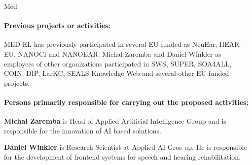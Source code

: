 \begin{sitedescription}{Med}
\paragraph*{Previous projects or activities:}

\begin{compactitem}
\item MED-EL has previously participated in several EU-funded as NeuEar, HEAR-EU, NANOCI and NANOEAR. Michal Zaremba and Daniel Winkler as employees of other organizations participated in SWS, SUPER, SOA4ALL, COIN, DIP, LarKC, SEALS Knowledge Web and several other EU-funded projects.
\end{compactitem}


\paragraph*{Persons primarily responsible for carrying out the proposed activities:}

\begin{compactitem} %

\item{\bf Michal Zaremba} is Head of Applied Artificial Intelligence Group and is responsible for the innovation of AI based solutions.

\item{\bf Daniel Winkler} is Research Scientist at Applied AI Gros
  up. He is responsible for the development of frontend systems for speech and hearing rehabilitation.
    
\end{compactitem}

\end{sitedescription}

